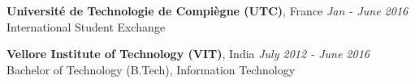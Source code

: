 
{\bf Universit\'e de Technologie de Compi\`egne (UTC)}, France \hfill
        {\em Jan - June 2016}\\
            International Student Exchange
            
{\bf Vellore Institute of Technology (VIT)}, India \hfill
    {\em July 2012 - June 2016}\\
        Bachelor of Technology (B.Tech), Information Technology